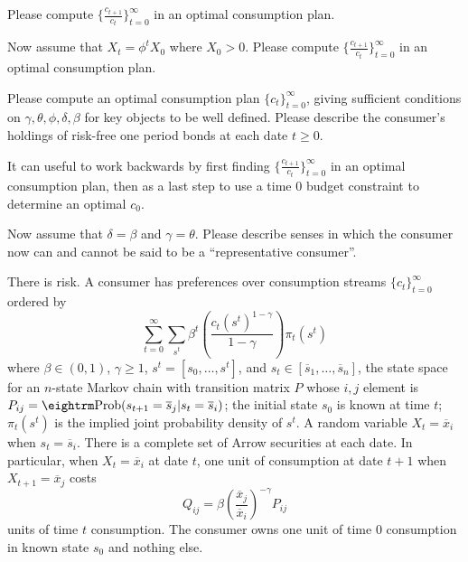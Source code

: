 \medskip
{} Please compute $\{{\frac{c_{t+1}}{c_t}}\}_{t=0}^\infty$ in an optimal consumption plan.


\medskip

  Now assume that %
$X_t = \phi^t X_0$ where $X_0 > 0$.  %
Please compute $\{{\frac{c_{t+1}}{c_t}}\}_{t=0}^\infty$ in an optimal consumption plan.

\medskip
{} Please compute an optimal consumption plan $\{c_t\}_{t=0}^\infty$, giving sufficient conditions on $\gamma, \theta, \phi, \delta, \beta$ for
key objects to be well defined.  Please describe the consumer's holdings of risk-free one period bonds at each
date $t \geq 0$.


 It can useful to work backwards by first finding $\{{\frac{c_{t+1}}{c_t}}\}_{t=0}^\infty$ in an optimal consumption plan,
then as a last step to use a time $0$ budget constraint to determine an optimal $c_0$.


\medskip

 Now assume that $\delta = \beta$ and $\gamma = \theta$.
Please describe  senses in which the consumer now  can and cannot be said to be a ``representative consumer''.

\medskip


\medskip
{}  
\medskip

\noindent
There is risk. A consumer has preferences over consumption streams $\{c_t\}_{t=0}^\infty$ ordered by
$$ \sum_{t=0}^\infty \sum_{s^t} \beta^t \left({\frac{c_t(s^t)^{1-\gamma}}{1 - \gamma}} \right) \pi_t(s^t)  $$
where $\beta \in (0,1)$, $\gamma \geq 1$, $s^t = [s_0, \ldots, s^t]$, and $s_t \in [\overline s_1, \ldots, \overline s_n]$, the state space
for an $n$-state Markov chain with transition matrix $P$ whose $i,j$ element is $P_{ij} = {\rm Prob}(s_{t+1} = \overline s_j | s_t = \overline s_i)$; the initial
state $s_0$ is known at time $t$; $\pi_t(s^t)$ is the implied joint probability density of $s^t$.
A random variable $X_t = \overline x_i$ when $s_t = \overline s_i$. There is a complete set of Arrow securities at each date.
In particular, when $X_t = \overline x_i$ at date $t$, one unit of consumption at date $t+1$ when $X_{t+1} = \overline x_j$ costs
$$ Q_{ij} = \beta \left( {\frac{\overline x_j}{\overline x_i}}\right)^{-\gamma} P_{ij} $$
units of time $t$ consumption. The consumer owns one unit of time $0$ consumption in known state $s_0$ and nothing else.


